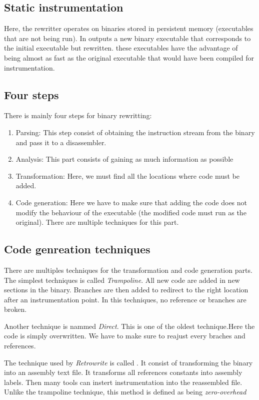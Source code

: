 \documentclass[a4paper,11pt,oneside]{report}
\begin{document}
\subsection{Static instrumentation}
Here, the rewritter operates on binaries stored in persistent memory
(executables that are not being run). In outputs a new binary executable that
corresponds to the initial executable but rewritten. these executables have the
advantage of being almost as fast as the original executable that would have
been compiled for instrumentation.
\subsection{Four steps}
There is mainly four steps for binary rewritting:
\begin{enumerate}
    \item Parsing:
         This step consist of obtaining the instruction stream from the binary
         and pass it to a disassembler.
    \item Analysis:
        This part consists of gaining as much information as possible
    \item Transformation:
        Here, we must find all the locations where  code must be added. 
    \item Code generation:
        Here we have to make sure that adding the code does not modify the
        behaviour of the executable (the modified code must run as the
        original). There are multiple techniques for this part.
\end{enumerate}
\subsection{Code genreation techniques}
There are multiples techniques for the transformation and code generation
parts. The simplest techniques is called \textit{Trampoline}. All new code are
added in new sections in the binary. Branches are then added to redirect to the
right location after an instrumentation point. In this techniques, no reference
or branches are broken.

Another technique is nammed \textit{Direct}. This is one of the oldest
technique.Here the code is simply overwritten. We have to make sure to reajust
every braches and references.


The technique used by \textit{Retrowrite} is called . It
consist of transforming the binary into an assembly text file. It transforms all references constants into assembly labels. Then many tools can instert instrumentation into the reassembled file. Unlike the trampoline technique, this method is defined as being \textit{zero-overhead}
\end{document}
